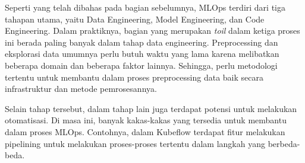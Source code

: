 Seperti yang telah dibahas pada bagian sebelumnya, MLOps terdiri dari tiga tahapan utama, yaitu Data Engineering, Model Engineering, dan Code Engineering.
Dalam praktiknya, bagian yang merupakan \textit{toil} dalam ketiga proses ini berada paling banyak dalam tahap data engineering.
Preprocessing dan eksplorasi data umumnya perlu butuh waktu yang lama karena melibatkan beberapa domain dan beberapa faktor lainnya.
Sehingga, perlu metodologi tertentu untuk membantu dalam proses preprocessing data baik secara infrastruktur dan metode pemrosesannya.

Selain tahap tersebut, dalam tahap lain juga terdapat potensi untuk melakukan otomatisasi.
Di masa ini, banyak kakas-kakas yang tersedia untuk membantu dalam proses MLOps.
Contohnya, dalam Kubeflow terdapat fitur melakukan pipelining untuk melakukan proses-proses tertentu dalam langkah yang berbeda-beda.